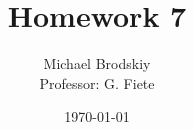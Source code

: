 


\title{Homework 7}
\date{\today}
\author{Michael Brodskiy\\ \small Professor: G. Fiete}



\maketitle


